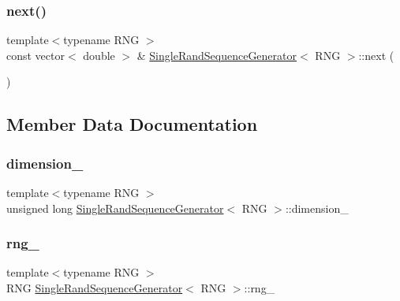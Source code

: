 \hypertarget{class_single_rand_sequence_generator_abb6b9fa64903d30cea5c1e03e0b1ca58}{}\label{class_single_rand_sequence_generator_abb6b9fa64903d30cea5c1e03e0b1ca58} 
\subsubsection{\texorpdfstring{next()}{next()}}
{\footnotesize\ttfamily template$<$typename R\+NG $>$ \\
const vector$<$ double $>$ \& \hyperlink{class_single_rand_sequence_generator}{Single\+Rand\+Sequence\+Generator}$<$ R\+NG $>$\+::next (\begin{DoxyParamCaption}{ }\end{DoxyParamCaption})}



\subsection{Member Data Documentation}
\hypertarget{class_single_rand_sequence_generator_a9cc3a5a32282f4d6ef9e6ae838647e3e}{}\label{class_single_rand_sequence_generator_a9cc3a5a32282f4d6ef9e6ae838647e3e} 
\subsubsection{\texorpdfstring{dimension\+\_\+}{dimension\_}}
{\footnotesize\ttfamily template$<$typename R\+NG $>$ \\
unsigned long \hyperlink{class_single_rand_sequence_generator}{Single\+Rand\+Sequence\+Generator}$<$ R\+NG $>$\+::dimension\+\_\+\hspace{0.3cm}{\ttfamily [private]}}

\hypertarget{class_single_rand_sequence_generator_ae558374c172ea997e1d7d717fc7fe95e}{}\label{class_single_rand_sequence_generator_ae558374c172ea997e1d7d717fc7fe95e} 
\subsubsection{\texorpdfstring{rng\+\_\+}{rng\_}}
{\footnotesize\ttfamily template$<$typename R\+NG $>$ \\
R\+NG \hyperlink{class_single_rand_sequence_generator}{Single\+Rand\+Sequence\+Generator}$<$ R\+NG $>$\+::rng\+\_\+\hspace{0.3cm}{\ttfamily [private]}}

